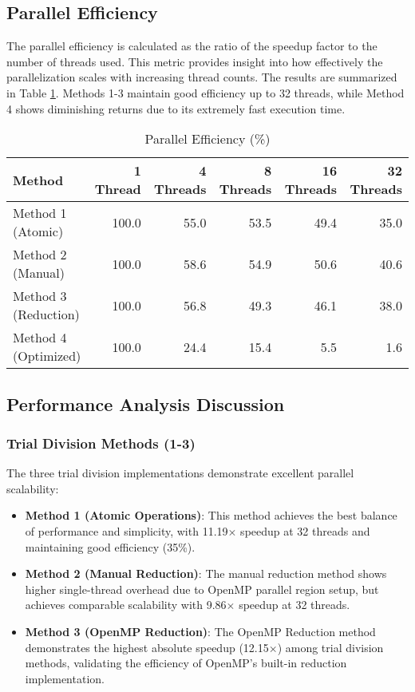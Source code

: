 \documentclass[11pt]{article}
\begin{document}
\subsection{Parallel Efficiency}

The parallel efficiency is calculated as the ratio of the speedup factor to the number of threads used. This metric provides insight into how effectively the parallelization scales with increasing thread counts. The results are summarized in Table \ref{tab:efficiency}. Methods 1-3 maintain good efficiency up to 32 threads, while Method 4 shows diminishing returns due to its extremely fast execution time.

\begin{table}[H]
\centering
\caption{Parallel Efficiency (\%)}
\label{tab:efficiency}
\footnotesize
\begin{tabular}{lrrrrr}
\hline
\textbf{Method} & \textbf{1 Thread} & \textbf{4 Threads} & \textbf{8 Threads} & \textbf{16 Threads} & \textbf{32 Threads} \\
\hline
Method 1 (Atomic) & 100.0 & 55.0 & 53.5 & 49.4 & 35.0 \\
Method 2 (Manual) & 100.0 & 58.6 & 54.9 & 50.6 & 40.6 \\
Method 3 (Reduction) & 100.0 & 56.8 & 49.3 & 46.1 & 38.0 \\
Method 4 (Optimized) & 100.0 & 24.4 & 15.4 & 5.5 & 1.6 \\
\hline
\end{tabular}
\end{table}

\subsection{Performance Analysis Discussion}

\subsubsection{Trial Division Methods (1-3)}

The three trial division implementations demonstrate excellent parallel scalability:

\begin{itemize}
    \item \textbf{Method 1 (Atomic Operations)}: This method achieves the best balance of performance and simplicity, with 11.19$\times$ speedup at 32 threads and maintaining good efficiency (35\%).
    
    \item \textbf{Method 2 (Manual Reduction)}: The manual reduction method shows higher single-thread overhead due to OpenMP parallel region setup, but achieves comparable scalability with 9.86$\times$ speedup at 32 threads.
    
    \item \textbf{Method 3 (OpenMP Reduction)}: The OpenMP Reduction method demonstrates the highest absolute speedup (12.15$\times$) among trial division methods, validating the efficiency of OpenMP's built-in reduction implementation.
\end{itemize}
\end{document}
